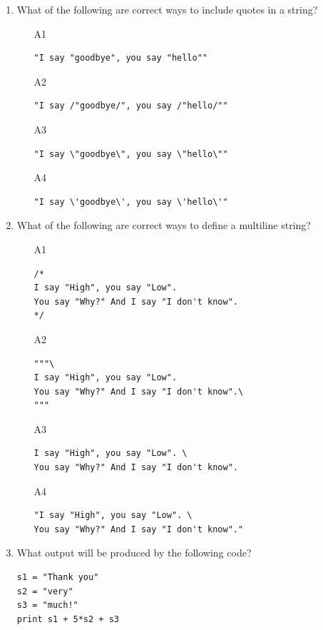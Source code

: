 \begin{enumerate}
\item What of the following are correct ways to include quotes in a string?
\begin{enumerate}
\item[A1] 
\begin{verbatim}
"I say "goodbye", you say "hello""
\end{verbatim}
\item[A2] 
\begin{verbatim}
"I say /"goodbye/", you say /"hello/""
\end{verbatim}
\item[A3] 
\begin{verbatim}
"I say \"goodbye\", you say \"hello\""
\end{verbatim}
\item[A4] 
\begin{verbatim}
"I say \'goodbye\', you say \'hello\'"
\end{verbatim}
\end{enumerate}
\item What of the following are correct ways to define a multiline string?
\begin{enumerate}
\item[A1] 
\begin{verbatim}
/*
I say "High", you say "Low".
You say "Why?" And I say "I don't know".
*/
\end{verbatim}
\item[A2] 
\begin{verbatim}
"""\
I say "High", you say "Low".
You say "Why?" And I say "I don't know".\
"""
\end{verbatim}
\item[A3] 
\begin{verbatim}
I say "High", you say "Low". \
You say "Why?" And I say "I don't know".
\end{verbatim}
\item[A4] 
\begin{verbatim}
"I say "High", you say "Low". \
You say "Why?" And I say "I don't know"."
\end{verbatim}
\end{enumerate}
\item What output will be produced by the following code?
\begin{verbatim}
s1 = "Thank you"
s2 = "very"
s3 = "much!"
print s1 + 5*s2 + s3
\end{verbatim}
\begin{enumerate}

\end{enumerate}
\end{enumerate}
